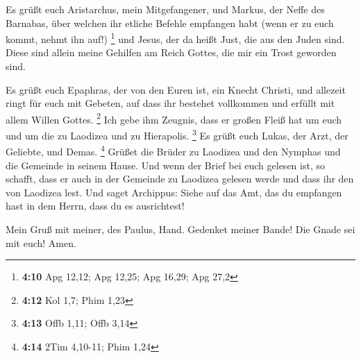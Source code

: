  Es grüßt euch Aristarchus, mein Mitgefangener, und
Markus, der Neffe des Barnabas, über welchen ihr etliche Befehle
empfangen habt (wenn er zu euch kommt, nehmt ihn auf!) \footnote{\textbf{4:10}
  Apg 12,12; Apg 12,25; Apg 16,29; Apg 27,2}  und Jesus,
der da heißt Just, die aus den Juden sind. Diese sind allein meine
Gehilfen am Reich Gottes, die mir ein Trost geworden sind.

 Es grüßt euch Epaphras, der von den Euren ist, ein
Knecht Christi, und allezeit ringt für euch mit Gebeten, auf dass ihr
bestehet vollkommen und erfüllt mit allem Willen Gottes. \footnote{\textbf{4:12}
  Kol 1,7; Phim 1,23}  Ich gebe ihm Zeugnis, dass er
großen Fleiß hat um euch und um die zu Laodizea und zu Hierapolis.
\footnote{\textbf{4:13} Offb 1,11; Offb 3,14}  Es grüßt
euch Lukas, der Arzt, der Geliebte, und Demas. \footnote{\textbf{4:14}
  2Tim 4,10-11; Phim 1,24}  Grüßet die Brüder zu Laodizea
und den Nymphas und die Gemeinde in seinem Hause.  Und
wenn der Brief bei euch gelesen ist, so schafft, dass er auch in der
Gemeinde zu Laodizea gelesen werde und dass ihr den von Laodizea lest.
 Und saget Archippus: Siehe auf das Amt, das du empfangen
hast in dem Herrn, dass du es ausrichtest!

 Mein Gruß mit meiner, des Paulus, Hand. Gedenket meiner
Bande! Die Gnade sei mit euch! Amen.
